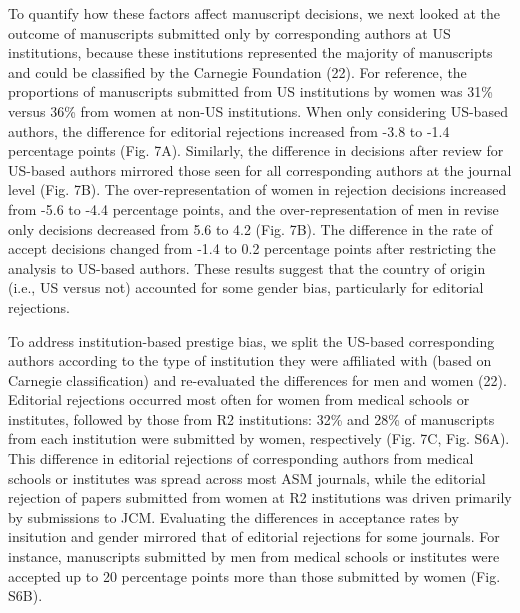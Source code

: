 \documentclass[11pt,]{article}
\begin{document}
To quantify how these factors affect manuscript decisions, we next
looked at the outcome of manuscripts submitted only by corresponding
authors at US institutions, because these institutions represented the
majority of manuscripts and could be classified by the Carnegie
Foundation (22). For reference, the proportions of manuscripts submitted
from US institutions by women was 31\% versus 36\% from women at non-US
institutions. When only considering US-based authors, the difference for
editorial rejections increased from -3.8 to -1.4 percentage points (Fig.
7A). Similarly, the difference in decisions after review for US-based
authors mirrored those seen for all corresponding authors at the journal
level (Fig. 7B). The over-representation of women in rejection decisions
increased from -5.6 to -4.4 percentage points, and the
over-representation of men in revise only decisions decreased from 5.6
to 4.2 (Fig. 7B). The difference in the rate of accept decisions changed
from -1.4 to 0.2 percentage points after restricting the analysis to
US-based authors. These results suggest that the country of origin
(i.e., US versus not) accounted for some gender bias, particularly for
editorial rejections.

To address institution-based prestige bias, we split the US-based
corresponding authors according to the type of institution they were
affiliated with (based on Carnegie classification) and re-evaluated the
differences for men and women (22). Editorial rejections occurred most
often for women from medical schools or institutes, followed by those
from R2 institutions: 32\% and 28\% of manuscripts from each institution
were submitted by women, respectively (Fig. 7C, Fig. S6A). This
difference in editorial rejections of corresponding authors from medical
schools or institutes was spread across most ASM journals, while the
editorial rejection of papers submitted from women at R2 institutions
was driven primarily by submissions to JCM. Evaluating the differences
in acceptance rates by insitution and gender mirrored that of editorial
rejections for some journals. For instance, manuscripts submitted by men
from medical schools or institutes were accepted up to 20 percentage
points more than those submitted by women (Fig. S6B).
\end{document}
